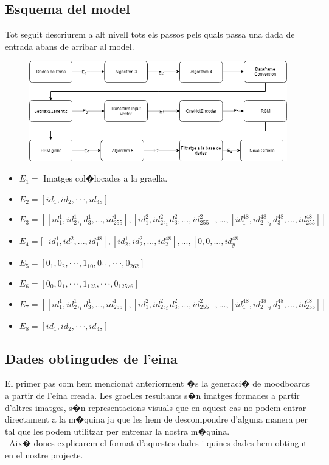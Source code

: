 \documentclass[12pt,a4paper,openright,oneside]{article}
\numberwithin{equation}{section}
\theoremstyle{definition}
\begin{document}
\subsection{Esquema del model}
Tot seguit descriurem a alt nivell tots els passos pels quals passa una dada de entrada abans de arribar al model.
\begin{figure}[h!]
\begin{center}
\includegraphics[width=\textwidth]{diagram2}
\end{center}
\end{figure}
\begin{itemize}
\item ${E_1 =}$ Imatges col�locades a la graella.
\item ${E_2 = [id_1, id_2, \cdot \cdot \cdot, id_{48}]}$
\item ${E_3 = [[id_1^1,id_2^1,_id_3^1, ...,id_{255}^1], [id_1^2,id_2^2,_id_3^2, ...,id_{255}^2], ..., [id_1^{48},id_2^{48},_id_3^{48}, ...,id_{255}^{48}]]}$
\item ${E_4 = [[id_1^1, id_1^2,..., id_1^{48}],
[id_2^1, id_2^2,..., id_2^{48}],..., [0,0,...,id_y^{48}]}$
\item ${E_5 = [0_1,0_2, \cdot \cdot \cdot, 1_{10}, 0_{11}, \cdot \cdot \cdot, 0_{262}]}$
\item ${E_6 = [0_0,0_1, \cdot\cdot\cdot, 1_{125}, \cdot\cdot\cdot, 0_{12576}]}$
\item ${E_7 = [[id_1^1,id_2^1,_id_3^1, ...,id_{255}^1], [id_1^2,id_2^2,_id_3^2, ...,id_{255}^2], ..., [id_1^{48},id_2^{48},_id_3^{48}, ...,id_{255}^{48}]]}$
\item ${E_8 = [id_1, id_2, \cdot \cdot \cdot, id_{48}]}$
\end{itemize}
\subsection{Dades obtingudes de l'eina}
El primer pas com hem mencionat anteriorment �s la generaci� de moodboards a partir de l'eina creada. Les graelles resultants s�n imatges formades a partir d'altres imatges, s�n representacions visuals que en aquest cas no podem entrar directament a la m�quina ja que les hem de descompondre d'alguna manera per tal que les podem utilitzar per entrenar la nostra m�quina.\\\
Aix� doncs explicarem el format d'aquestes dades i quines dades hem obtingut en el nostre projecte.
\end{document}
